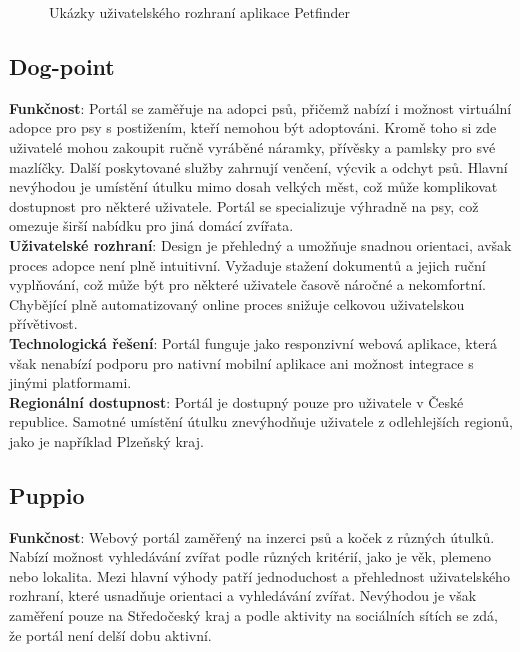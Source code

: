 \documentclass[12pt,a4paper]{report}
\begin{document}
\begin{figure}[h!]
    \caption{Ukázky uživatelského rozhraní aplikace Petfinder} %
    \label{fig:obrazky-vedle-sebe}
\end{figure}


\subsection{Dog-point}

\noindent \textbf{Funkčnost}: Portál se zaměřuje na adopci psů, přičemž nabízí i možnost virtuální adopce pro psy s postižením, kteří nemohou být adoptováni. Kromě toho si zde uživatelé mohou zakoupit ručně vyráběné náramky, přívěsky a pamlsky pro své mazlíčky. Další poskytované služby zahrnují venčení, výcvik a odchyt psů. Hlavní nevýhodou je umístění útulku mimo dosah velkých měst, což může komplikovat dostupnost pro některé uživatele. Portál se specializuje výhradně na psy, což omezuje širší nabídku pro jiná domácí zvířata.\\

\noindent \textbf{Uživatelské rozhraní}: Design je přehledný a umožňuje snadnou orientaci, avšak proces adopce není plně intuitivní. Vyžaduje stažení dokumentů a jejich ruční vyplňování, což může být pro některé uživatele časově náročné a nekomfortní. Chybějící plně automatizovaný online proces snižuje celkovou uživatelskou přívětivost.\\

\noindent \textbf{Technologická řešení}: Portál funguje jako responzivní webová aplikace, která však nenabízí podporu pro nativní mobilní aplikace ani možnost integrace s jinými platformami.\\

\noindent \textbf{Regionální dostupnost}: Portál je dostupný pouze pro uživatele v České republice. Samotné umístění útulku znevýhodňuje uživatele z odlehlejších regionů, jako je například Plzeňský kraj.\\


\subsection{Puppio}

\noindent \textbf{Funkčnost}: Webový portál zaměřený na inzerci psů a koček z různých útulků. Nabízí možnost vyhledávání zvířat podle různých kritérií, jako je věk, plemeno nebo lokalita. Mezi hlavní výhody patří jednoduchost a přehlednost uživatelského rozhraní, které usnadňuje orientaci a vyhledávání zvířat. Nevýhodou je však zaměření pouze na Středočeský kraj a podle aktivity na sociálních sítích se zdá, že portál není delší dobu aktivní.\\
\end{document}
